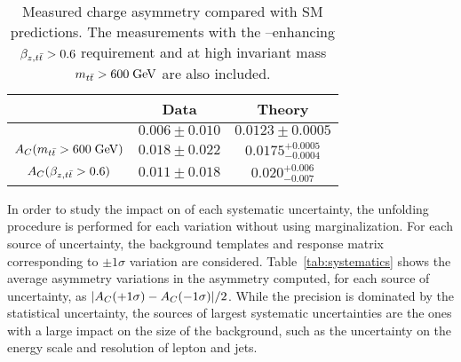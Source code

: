 \begin{table}[!htb]\centering
\begin{tabular}{c c c}
\toprule
  & Data & Theory\\
\midrule
 \ac{}                                     & $0.006\pm0.010$ & $0.0123\pm0.0005$ \\
 $A_C{}(m_{t\bar{t}}{} > 600 \; \mathrm{GeV}{})$ & $0.018\pm0.022$ & $0.0175^{+0.0005}_{-0.0004}$\\
 $A_C{}(\beta_{z,t\bar{t}}>0.6)$   & $0.011\pm0.018$ & $0.020^{+0.006}_{-0.007}$\\
\bottomrule
\end{tabular}
\caption{Measured charge asymmetry \ac{} compared with SM
  predictions. The measurements with the \qqbar{}--enhancing
  $\beta_{z,t\bar{t}} > 0.6$ requirement and at high \ttbar{} invariant
  mass $m_{t\bar{t}}{} > 600 \; \mathrm{GeV}{}$ are also included.}
\label{tab:results}
\end{table}

In order to study the impact on \ac{} of each systematic uncertainty,
the unfolding procedure is performed for each variation without using
marginalization. 
For each source of uncertainty, the background templates and
response matrix corresponding to $\pm1\sigma$ variation are
considered. 
Table~\ref{tab:systematics} shows the average asymmetry variations in the
asymmetry computed, for each source of uncertainty, as
$|A_C{}(+1\sigma)-A_C{}(-1\sigma)|/2$. 
While the precision is dominated by the statistical uncertainty, the
sources of largest systematic uncertainties are the ones with a large
impact on the size of the \wjets{} background, such as the
uncertainty on the energy scale and resolution of lepton and jets. 

